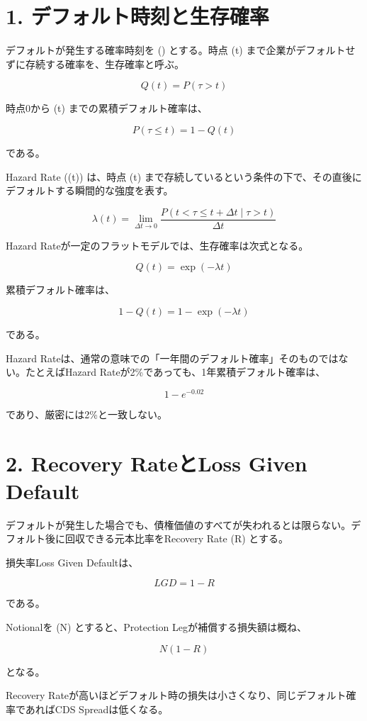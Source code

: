 \documentclass[
  letterpaper,
  DIV=11,
  numbers=noendperiod]{scrreprt}
\begin{document}
\section{1.
デフォルト時刻と生存確率}\label{ux30c7ux30d5ux30a9ux30ebux30c8ux6642ux523bux3068ux751fux5b58ux78baux7387}

デフォルトが発生する確率時刻を (\tau) とする。時点 (t)
まで企業がデフォルトせずに存続する確率を、生存確率と呼ぶ。

\[
Q(t)
=
P(\tau>t)
\]

時点0から (t) までの累積デフォルト確率は、

\[
P(\tau\leq t)
=
1-Q(t)
\]

である。

Hazard Rate (\lambda(t)) は、時点 (t)
まで存続しているという条件の下で、その直後にデフォルトする瞬間的な強度を表す。

\[
\lambda(t)
=
\lim_{\Delta t\to 0}
\frac{
P(t<\tau\leq t+\Delta t\mid \tau>t)
}{
\Delta t
}
\]

Hazard Rateが一定のフラットモデルでは、生存確率は次式となる。

\[
Q(t)
=
\exp(-\lambda t)
\]

累積デフォルト確率は、

\[
1-Q(t)
=
1-\exp(-\lambda t)
\]

である。

Hazard
Rateは、通常の意味での「一年間のデフォルト確率」そのものではない。たとえばHazard
Rateが2\%であっても、1年累積デフォルト確率は、

\[
1-e^{-0.02}
\]

であり、厳密には2\%と一致しない。

\section{2. Recovery RateとLoss Given
Default}\label{recovery-rateux3068loss-given-default}

デフォルトが発生した場合でも、債権価値のすべてが失われるとは限らない。デフォルト後に回収できる元本比率をRecovery
Rate (R) とする。

損失率Loss Given Defaultは、

\[
LGD
=
1-R
\]

である。

Notionalを (N) とすると、Protection Legが補償する損失額は概ね、

\[
N(1-R)
\]

となる。

Recovery
Rateが高いほどデフォルト時の損失は小さくなり、同じデフォルト確率であればCDS
Spreadは低くなる。
\end{document}
